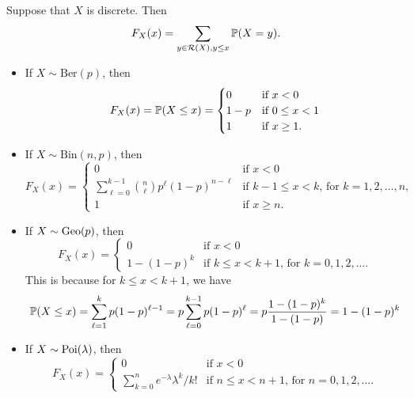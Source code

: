 \begin{example}
  Suppose that $X$ is discrete. Then
  \[
    F_X(x) = \sum_{y \in \mathcal{R}(X), y \le x} \mathbb{P}(X = y).
  \]
  \begin{itemize}
    \item If $X \sim \mathrm{Ber}(p)$, then
      \[
        F_X(x) = \mathbb{P}(X \le x) =
        \begin{cases}
          0 & \text{if $x < 0$} \\
          1 - p & \text{if $0 \le x < 1$} \\
          1 & \text{if $x \ge 1$}.
        \end{cases}
      \]
    \item If $X \sim \mathrm{Bin}(n, p)$, then
      \[
        F_X(x) =
        \begin{cases}
          0 & \text{if $x < 0$} \\
          \sum_{\ell = 0}^{k - 1} \binom{n}{\ell} p^\ell (1 - p)^{n - \ell} & \text{if $k - 1 \le x < k$, for $k = 1, 2, \dots, n$,} \\
          1 & \text{if $x \ge n$}.
        \end{cases}
      \]
    \item If $X \sim \operatorname{Geo}(p)$, then
      \[
        F_X(x) =
        \begin{cases}
          0 & \text{if $x < 0$} \\
          1 - (1 - p)^k & \text{if $k \le x < k + 1$, for $k = 0, 1, 2, \dots$}.
        \end{cases}
      \]
      This is because for $k \le x < k + 1$, we have
      \[
        \mathbb{P}(X \le x)
        = \sum_{\ell = 1}^k p(1 - p)^{\ell - 1}
        = p \sum_{\ell = 0}^{k - 1} p(1 - p)^{\ell}
        = p \frac{1 - (1 - p)^k}{1 - (1 - p)}
        = 1 - (1 - p)^k
      \]
    \item If $X \sim \operatorname{Poi}(\lambda)$, then
      \[
        F_X(x) =
        \begin{cases}
          0 & \text{if $x < 0$} \\
          \sum_{k = 0}^{n} e^{-\lambda} \lambda^k / k! & \text{if $n \le x < n + 1$, for $n = 0, 1, 2, \dots$}.
        \end{cases}
      \]
  \end{itemize}
\end{example}

